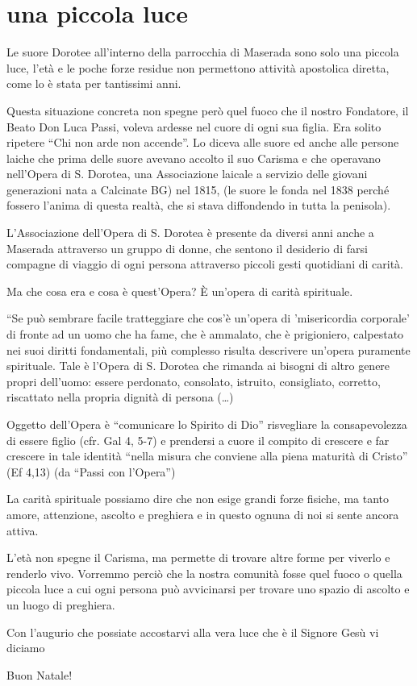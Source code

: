 \section{una piccola luce}

Le suore Dorotee all'interno della parrocchia di Maserada sono solo una piccola luce, l'età e le poche forze residue non permettono attività apostolica diretta, come lo è stata per tantissimi anni.


Questa situazione concreta non spegne però quel fuoco che il nostro Fondatore, il Beato Don Luca Passi, voleva ardesse nel cuore di ogni sua figlia. Era solito ripetere ``Chi non arde non accende''. Lo diceva alle suore ed anche alle persone laiche che prima delle suore avevano accolto il suo Carisma e che operavano nell'Opera di S. Dorotea, una Associazione laicale a servizio delle giovani generazioni nata a Calcinate BG) nel 1815, (le suore le fonda nel 1838 perché fossero l'anima di questa realtà, che si stava diffondendo in tutta la penisola).

L'Associazione dell'Opera di S. Dorotea è presente da diversi anni anche a Maserada attraverso un gruppo di donne, che sentono il desiderio di farsi compagne di viaggio di ogni persona attraverso piccoli gesti quotidiani di carità.


Ma che cosa era e cosa è quest'Opera? È un'opera di carità spirituale.

``Se può sembrare facile tratteggiare che cos'è un'opera di 'misericordia corporale' di fronte ad un uomo che ha fame, che è ammalato, che è prigioniero, calpestato nei suoi diritti fondamentali, più complesso risulta descrivere un'opera puramente spirituale. Tale è l'Opera di S. Dorotea che rimanda ai bisogni di altro genere propri dell'uomo: essere perdonato, consolato, istruito, consigliato, corretto, riscattato nella propria dignità di persona (\dots)

Oggetto dell'Opera è ``comunicare lo Spirito di Dio'' risvegliare la consapevolezza di essere figlio (cfr. Gal 4, 5-7) e prendersi a cuore il compito di crescere e far crescere in tale identità ``nella misura che conviene alla piena maturità di Cristo'' (Ef 4,13) (da ``Passi con l'Opera'')


La carità spirituale possiamo dire che non esige grandi forze fisiche, ma tanto amore, attenzione, ascolto e preghiera e in questo ognuna di noi si sente ancora attiva.

L'età non spegne il Carisma, ma permette di trovare altre forme per viverlo e renderlo vivo. Vorremmo perciò che la nostra comunità fosse quel fuoco o quella piccola luce a cui ogni persona può avvicinarsi per trovare uno spazio di ascolto e un luogo di preghiera.

Con l'augurio che possiate accostarvi alla vera luce che è il Signore Gesù vi diciamo

Buon Natale!


